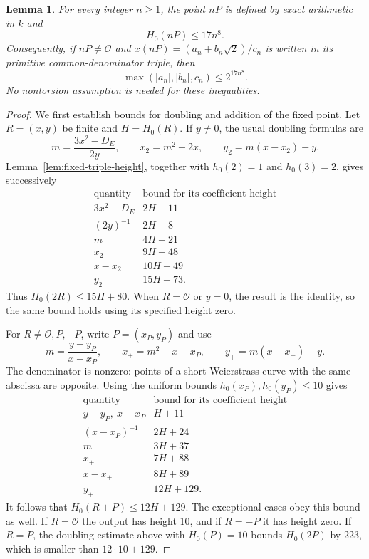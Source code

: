 \documentclass[11pt]{article}
\newtheorem{lemma}[theorem]{Lemma}
\theoremstyle{definition}
\begin{document}
\begin{lemma}\label{lem:fixed-point-binary-height}
For every integer $n\ge1$, the point $nP$ is defined by exact
arithmetic in $k$ and
\[
                         H_0(nP)\le17n^8.
\]
Consequently, if $nP\ne\mathcal O$ and
$x(nP)=(a_n+b_n\sqrt2)/c_n$ is written in its primitive
common-denominator triple, then
\[
               \max(|a_n|,|b_n|,c_n)\le2^{17n^8}.
\]
No nontorsion assumption is needed for these inequalities.
\end{lemma}
\begin{proof}
We first establish bounds for doubling and addition of the fixed point.
Let $R=(x,y)$ be finite and $H=H_0(R)$.  If $y\ne0$, the usual
doubling formulas are
\[
 m=\frac{3x^2-D_E}{2y},\qquad
 x_2=m^2-2x,\qquad y_2=m(x-x_2)-y.
\]
Lemma~\ref{lem:fixed-triple-height}, together with
$h_0(2)=1$ and $h_0(3)=2$, gives successively
\[
 \begin{array}{c|c}
 \text{quantity}&\text{bound for its coefficient height}\\ \hline
 3x^2-D_E&2H+11\\
 (2y)^{-1}&2H+8\\
 m&4H+21\\
 x_2&9H+48\\
 x-x_2&10H+49\\
 y_2&15H+73.
 \end{array}
\]
Thus $H_0(2R)\le15H+80$.  When $R=\mathcal O$ or $y=0$,
the result is the identity, so the same bound holds using its
specified height zero.

For $R\ne\mathcal O,P,-P$, write $P=(x_P,y_P)$ and use
\[
 m=\frac{y-y_P}{x-x_P},\qquad
 x_+=m^2-x-x_P,\qquad y_+=m(x-x_+)-y.
\]
The denominator is nonzero: points of a short Weierstrass curve with
the same abscissa are opposite.  Using the uniform bounds
$h_0(x_P),h_0(y_P)\le10$ gives
\[
 \begin{array}{c|c}
 \text{quantity}&\text{bound for its coefficient height}\\ \hline
 y-y_P,\ x-x_P&H+11\\
 (x-x_P)^{-1}&2H+24\\
 m&3H+37\\
 x_+&7H+88\\
 x-x_+&8H+89\\
 y_+&12H+129.
 \end{array}
\]
It follows that $H_0(R+P)\le12H+129$.  The exceptional cases
obey this bound as well.  If $R=\mathcal O$ the output has height
10, and if $R=-P$ it has height zero.  If $R=P$, the doubling
estimate above with $H_0(P)=10$ bounds $H_0(2P)$ by 223,
which is smaller than $12\cdot10+129$.


\end{proof}
\end{document}
